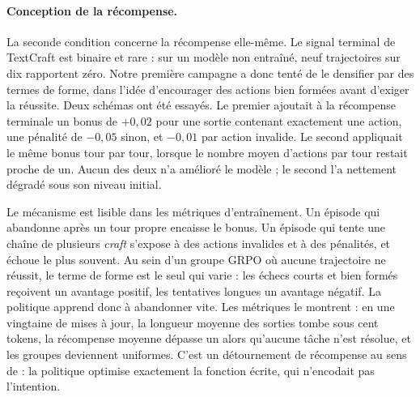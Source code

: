 \documentclass[11pt,a4paper]{article}
\begin{document}
\paragraph{Conception de la récompense.} La seconde condition concerne la récompense elle-même. Le signal terminal de TextCraft est binaire et rare : sur un modèle non entraîné, neuf trajectoires sur dix rapportent zéro. Notre première campagne a donc tenté de le densifier par des termes de forme, dans l'idée d'encourager des actions bien formées avant d'exiger la réussite. Deux schémas ont été essayés. Le premier ajoutait à la récompense terminale un bonus de $+0{,}02$ pour une sortie contenant exactement une action, une pénalité de $-0{,}05$ sinon, et $-0{,}01$ par action invalide. Le second appliquait le même bonus tour par tour, lorsque le nombre moyen d'actions par tour restait proche de un. Aucun des deux n'a amélioré le modèle ; le second l'a nettement dégradé sous son niveau initial.

Le mécanisme est lisible dans les métriques d'entraînement. Un épisode qui abandonne après un tour propre encaisse le bonus. Un épisode qui tente une chaîne de plusieurs \emph{craft} s'expose à des actions invalides et à des pénalités, et échoue le plus souvent. Au sein d'un groupe GRPO où aucune trajectoire ne réussit, le terme de forme est le seul qui varie : les échecs courts et bien formés reçoivent un avantage positif, les tentatives longues un avantage négatif. La politique apprend donc à abandonner vite. Les métriques le montrent : en une vingtaine de mises à jour, la longueur moyenne des sorties tombe sous cent tokens, la récompense moyenne dépasse un alors qu'aucune tâche n'est résolue, et les groupes deviennent uniformes. C'est un détournement de récompense au sens de \cite{skalse2022defining} : la politique optimise exactement la fonction écrite, qui n'encodait pas l'intention.
\end{document}
